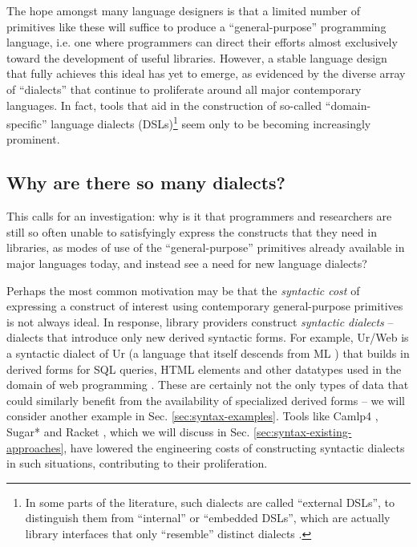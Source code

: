The hope amongst many language designers is that a limited number of primitives like these will suffice to produce a ``general-purpose'' programming language, i.e. one where programmers can direct their efforts almost exclusively toward the development of useful libraries. However, a stable language design that fully achieves this ideal has yet to emerge, as evidenced by the diverse array of ``dialects'' that continue to proliferate around all major contemporary languages. 
In fact, tools that aid in the construction of so-called  ``domain-specific'' language dialects (DSLs)\footnote{In some parts of the literature, such dialects are called ``external DSLs'', to distinguish them from  ``internal'' or ``embedded DSLs'', which are actually  library interfaces that only ``resemble'' distinct dialects \cite{fowler2010domain}.} seem only to be becoming increasingly prominent.


\subsection{Why are there so many dialects?}
{This calls for an investigation}: why is it that programmers and researchers are still so often unable to satisfyingly express the constructs that they need in libraries, as modes of use of the ``general-purpose'' primitives already available in major languages today, and instead see a need for new language dialects?

Perhaps the most common motivation may be that the \emph{syntactic cost} of expressing a construct of interest using contemporary general-purpose primitives is not always ideal. In response, library providers construct \emph{syntactic dialects} -- dialects that introduce only new derived syntactic forms. 
For example, Ur/Web is a syntactic dialect of Ur (a language that itself descends from ML \cite{conf/pldi/Chlipala10}) that builds in derived forms for SQL queries, HTML elements and other datatypes used in the domain of web programming \cite{conf/popl/Chlipala15}. %
These are certainly not the only types of data that could similarly benefit from the availability of specialized derived forms -- we will consider another example in Sec. \ref{sec:syntax-examples}. 
Tools like Camlp4 \cite{ocaml-manual}, Sugar* \cite{erdweg2011sugarj,erdweg2013framework} and Racket \cite{Flatt:2012:CLR:2063176.2063195}, which we will discuss in Sec. \ref{sec:syntax-existing-approaches}, have lowered the engineering costs of constructing syntactic dialects in such situations, contributing to their proliferation. 

